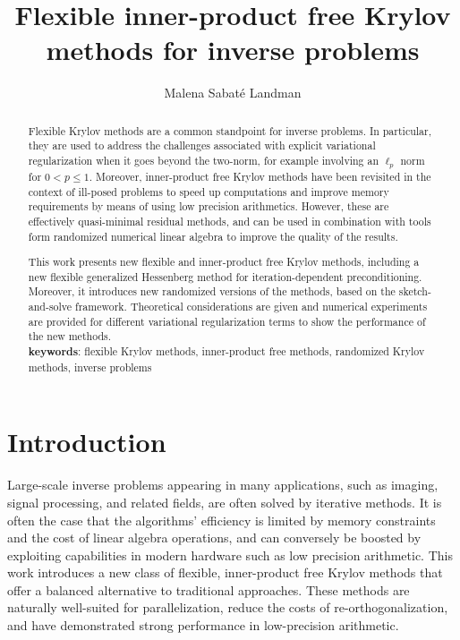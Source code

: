 \documentclass[11pt]{article}
\title{Flexible inner-product free Krylov methods for inverse problems}
\author[1]{Malena Sabaté Landman}
\affil[1]{Mathematical Institute, Oxford, \textit{malena.sabatelandman@maths.ox.ac.uk}}
\date{}
\numberwithin{equation}{section}
\begin{document}
\maketitle
\begin{abstract}
Flexible Krylov methods are a common standpoint for inverse problems. In particular, they are used to address the challenges associated with explicit variational regularization when it goes beyond the two-norm, for example involving an $\ell_p$ norm for $0<p\leq 1$. Moreover, inner-product free Krylov methods have been revisited in the context of ill-posed problems to speed up computations and improve memory requirements by means of using low precision arithmetics. However, these are effectively quasi-minimal residual methods, and can be used in combination with tools form randomized numerical linear algebra to improve the quality of the results.

This work presents new flexible and inner-product free Krylov methods, including a new flexible generalized Hessenberg method for iteration-dependent preconditioning. Moreover, it introduces new randomized versions of the methods, based on the sketch-and-solve framework. Theoretical considerations are given and numerical experiments are provided for different variational regularization terms to show the performance of the new methods. \\

\noindent \textbf{keywords}: flexible Krylov methods, inner-product free methods, randomized Krylov methods, inverse problems%
\end{abstract}


\section{Introduction}\label{sec1}
Large-scale inverse problems appearing in many applications, such as imaging, signal processing, and related fields, are often solved by iterative methods. 
It is often the case that the algorithms' efficiency is limited by memory constraints and the cost of linear algebra operations, and can conversely be boosted by exploiting capabilities in modern hardware such as low precision arithmetic. This work introduces a new class of flexible, inner-product free Krylov methods that offer a balanced alternative to traditional approaches. These methods are naturally well-suited for parallelization, reduce the costs of re-orthogonalization, and have demonstrated strong performance in low-precision arithmetic.
\end{document}
